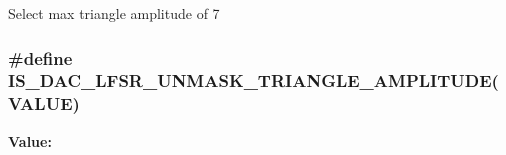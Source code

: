 \label{group__DAC__lfsrunmask__triangleamplitude_gad3f31de1277836df1109576a53c47e87}
Select max triangle amplitude of 7 \hypertarget{group__DAC__lfsrunmask__triangleamplitude_ga20f7c3c43f917f14593f0c478c2412e1}{
\subsubsection[{IS\_\-DAC\_\-LFSR\_\-UNMASK\_\-TRIANGLE\_\-AMPLITUDE}]{\setlength{\rightskip}{0pt plus 5cm}\#define IS\_\-DAC\_\-LFSR\_\-UNMASK\_\-TRIANGLE\_\-AMPLITUDE(VALUE)}}
\label{group__DAC__lfsrunmask__triangleamplitude_ga20f7c3c43f917f14593f0c478c2412e1}
{\bfseries Value:}
